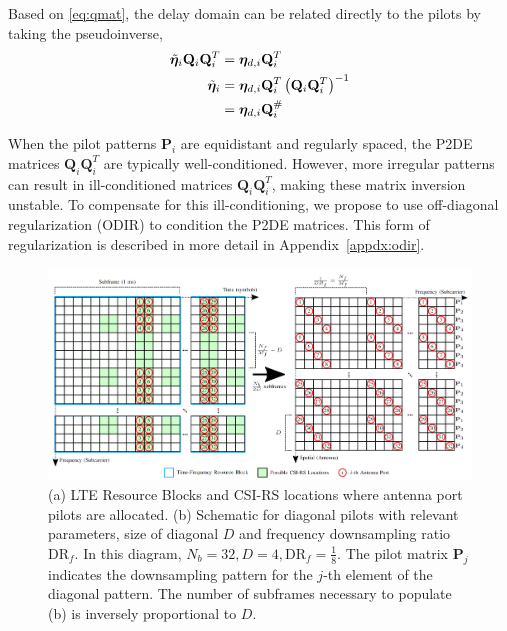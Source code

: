 Based on \ref{eq:qmat}, the delay domain can be related directly to the pilots by taking the pseudoinverse,
\begin{align}
	\tilde{\boldsymbol{\eta}}_{i}\mathbf{Q}_i\mathbf{Q}_i^T &= \boldsymbol{\eta}_{d,i}\mathbf{Q}_i^T \nonumber \\
	\tilde{\boldsymbol{\eta}}_{i} &= \boldsymbol{\eta}_{d,i}\mathbf{Q}_i^T\left(\mathbf{Q}_i\mathbf{Q}_i^T\right)^{-1} \nonumber \\
	&= \boldsymbol{\eta}_{d,i}\mathbf{Q}_i^{\#} \label{eq:p2d}
\end{align}


When the pilot patterns $\mathbf{P}_i$ are equidistant and regularly spaced, the P2DE matrices $\mathbf{Q}_i\mathbf{Q}_i^T$ are typically well-conditioned. However, more irregular patterns can result in ill-conditioned matrices $\mathbf{Q}_i\mathbf{Q}_i^T$, making these matrix inversion unstable. To compensate for this ill-conditioning, we propose to use off-diagonal regularization (ODIR) to condition the P2DE matrices. This form of regularization is described in more detail in Appendix~\ref{appdx:odir}. 

\begin{figure}[!hbtp]
    \centering
    \includegraphics[width=\linewidth]{images/01_p2d_pilots_diag_with_resource_grid.png}
    \caption{(a) LTE Resource Blocks and CSI-RS locations where antenna port pilots are allocated. (b) Schematic for diagonal pilots with relevant parameters, size of diagonal $D$ and frequency downsampling ratio $\text{DR}_f$. In this diagram, $N_b=32, D=4, \text{DR}_f=\frac 18$. The pilot matrix $\mathbf{P}_j$ indicates the downsampling pattern for the $j$-th element of the diagonal pattern. The number of subframes necessary to populate (b) is inversely proportional to $D$.}
    \label{fig:p2d_diag}
\end{figure}

